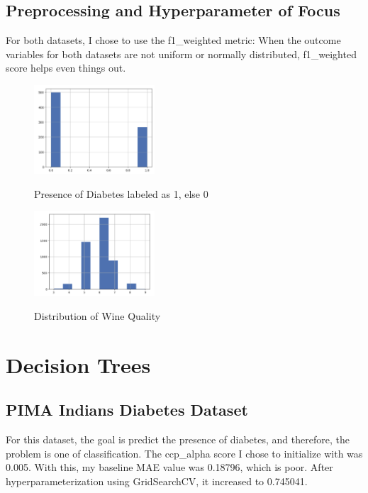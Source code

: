 \documentclass[conference]{IEEEtran}
\begin{document}
\subsection{Preprocessing and Hyperparameter of Focus}
For both datasets, I chose to use the f1\_weighted metric: When the outcome variables for both datasets are not uniform or normally distributed, f1\_weighted score helps even things out.


\begin{figure}[H]
    \centering
    \includegraphics[width=0.40\textwidth]{Preprocessing Graphs/pima outcome var.png}
    \label{fig:enter-label}
    \caption{Presence of Diabetes labeled as 1, else 0}
\end{figure}

 \begin{figure}[H]
    \centering
    \includegraphics[width=0.40\textwidth]{Preprocessing Graphs/rwq outcome var.png}
    \label{fig:enter-label}
    \caption{Distribution of Wine Quality}
\end{figure}


\section{Decision Trees}

\subsection{\textbf{PIMA Indians Diabetes Dataset}}\label{AA}
For this dataset, the goal is predict the presence of diabetes, and therefore, the problem is one of classification. The ccp\_alpha score I chose to initialize with was 0.005. With this, my baseline MAE value was 0.18796, which is poor. After hyperparameterization using GridSearchCV, it increased to 0.745041. 
\end{document}
